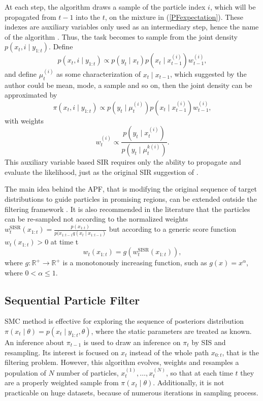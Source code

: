 At each step, the algorithm draws a sample of the particle index $i$, which will be propagated from $t-1$ into the $t$, on the mixture in (\ref{PFexpectation}). These indexes are auxiliary variables only used as an intermediary step, hence the name of the algorithm \cite{pitt1999filtering}. Thus, the task becomes to sample from the joint density $p(x_t,i\mid y_{1:t})$. Define 
\begin{equation}
p(x_t,i\mid y_{1:t})\propto p(y_t\mid x_t)p(x_t\mid x_{t-1}^{(i)})w_{t-1}^{(i)}, 
\end{equation}
and define $\mu_t^{(i)}$ as some characterization of $x_t\mid x_{t-1}$, which suggested by the author could be mean, mode, a sample and so on, then the joint density can be approximated by  
\begin{equation}
\pi(x_t,i\mid y_{1:t})\propto p(y_t\mid \mu_t^{(i)})p(x_t\mid x_{t-1}^{(i)})w_{t-1}^{(i)}, 
\end{equation}
with weights
\begin{equation*}
w_t^{(i)}\propto \frac{ p(y_t\mid x_t^{(i)})  }{  p(y_t\mid\mu_t^{k(i)})   }.
\end{equation*}
This auxiliary variable based SIR requires only the ability to propagate and evaluate the likelihood, just as the original SIR suggestion of \cite{gordon1993novel}.  

The main idea behind the APF, that is modifying the original sequence of target distributions to guide particles in promising regions, can be extended outside the filtering framework \cite{JOHANSEN20081498}. It is also recommended in the literature \cite{liu2008monte} that the particles can be re-sampled not according to the normalized weights $w_t^{\mbox{SISR}}(x_{1:t})=\frac{p(x_{1:t})}{ p(x_{1:t-1}q(x_t\mid x_{1:t-1})  }$  but according to a generic score function $w_t(x_{1:t})>0$ at time t
\begin{equation*}
w_t(x_{1:t}) = g(w_t^{\mbox{SISR}}(x_{1:t})),
\end{equation*}
where $g: \mathbb{R}^+\rightarrow \mathbb{R}^+$ is a monotonously increasing function, such as $g(x)=x^\alpha$, where $0<\alpha\leq 1$. 



\subsection{Sequential Particle Filter}


SMC method is effective for exploring the sequence of posteriors distribution  $\pi(x_t\mid\theta) = p(x_t\mid y_{1:t},\theta)$, where the static parameters are
treated as known. An inference about $\pi_{t-1}$ is used to draw an inference on $\pi_t$ by SIS and resampling. Its interest is focused on $x_t$ instead of the whole path $x_{0:t}$, that is the filtering problem. However, this algorithm evolves, weights and resamples a population of $N$ number of particles, $x_t^{(1)},\dots,x_t^{(N)}$, so that at each time $t$ they are a properly weighted sample from $\pi(x_t \mid \theta)$. Additionally, it is not practicable on huge datasets, because of numerous iterations in sampling process. 

